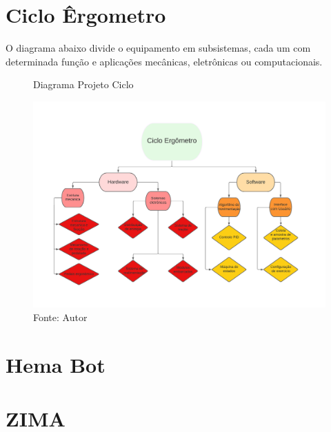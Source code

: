 \documentclass[]{politex}
\begin{document}




\part{Ciclo Êrgometro} 
O diagrama abaixo divide o equipamento em subsistemas, cada um com determinada função e aplicações mecânicas, eletrônicas ou computacionais.

\begin{figure}[h]
	\centering
		\caption{Diagrama Projeto Ciclo}
		\centering %
		\includegraphics[width=17cm]{images/Diagrama ciclo.pdf}
		\caption*{Fonte: Autor}
		\label{figura:Diagrama Projeto Ciclo}
	\end{figure}




\part{Hema Bot} 



\part{ZIMA} 

\end{document}
